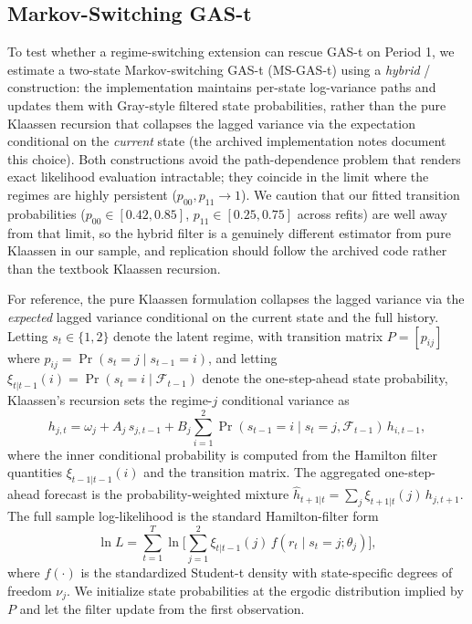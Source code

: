 \subsection{Markov-Switching GAS-t}

To test whether a regime-switching extension can rescue GAS-t on Period 1, we estimate a two-state Markov-switching GAS-t (MS-GAS-t) using a \emph{hybrid} \citet{gray1996}/\citet{klaassen2002} construction: the implementation maintains per-state log-variance paths and updates them with Gray-style filtered state probabilities, rather than the pure Klaassen recursion that collapses the lagged variance via the expectation conditional on the \emph{current} state (the archived implementation notes document this choice). Both constructions avoid the \citet{hamilton1989} path-dependence problem that renders exact likelihood evaluation intractable; they coincide in the limit where the regimes are highly persistent ($p_{00}, p_{11} \to 1$). We caution that our fitted transition probabilities ($p_{00} \in [0.42, 0.85]$, $p_{11} \in [0.25, 0.75]$ across refits) are well away from that limit, so the hybrid filter is a genuinely different estimator from pure Klaassen in our sample, and replication should follow the archived code rather than the textbook Klaassen recursion.

For reference, the pure Klaassen formulation collapses the lagged variance via the \emph{expected} lagged variance conditional on the current state and the full history. Letting $s_t \in \{1,2\}$ denote the latent regime, with transition matrix $P = [p_{ij}]$ where $p_{ij} = \Pr(s_t = j \mid s_{t-1} = i)$, and letting $\xi_{t|t-1}(i) = \Pr(s_t = i \mid \mathcal{F}_{t-1})$ denote the one-step-ahead state probability, Klaassen's recursion sets the regime-$j$ conditional variance as
\begin{equation}
h_{j,t} = \omega_j + A_j\, s_{j,t-1} + B_j \sum_{i=1}^{2} \Pr(s_{t-1}=i \mid s_t=j, \mathcal{F}_{t-1})\, h_{i,t-1},
\end{equation}
where the inner conditional probability is computed from the Hamilton filter quantities $\xi_{t-1|t-1}(i)$ and the transition matrix. The aggregated one-step-ahead forecast is the probability-weighted mixture $\hat h_{t+1|t} = \sum_j \xi_{t+1|t}(j)\, h_{j,t+1}$. The full sample log-likelihood is the standard Hamilton-filter form
\begin{equation}
\ln L = \sum_{t=1}^{T} \ln\!\Big[\sum_{j=1}^{2} \xi_{t|t-1}(j)\, f(r_t \mid s_t = j; \theta_j)\Big],
\end{equation}
where $f(\cdot)$ is the standardized Student-t density with state-specific degrees of freedom $\nu_j$. We initialize state probabilities at the ergodic distribution implied by $P$ and let the filter update from the first observation.


